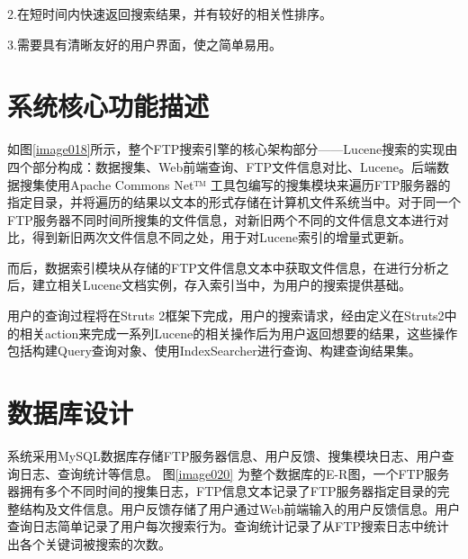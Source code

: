 2.在短时间内快速返回搜索结果，并有较好的相关性排序。

3.需要具有清晰友好的用户界面，使之简单易用。
\section{系统核心功能描述}
如图\ref{image018}所示，整个FTP搜索引擎的核心架构部分——Lucene搜索的实现由四个部分构成：数据搜集、Web前端查询、FTP文件信息对比、Lucene。后端数据搜集使用Apache Commons Net™ 工具包编写的搜集模块来遍历FTP服务器的指定目录，并将遍历的结果以文本的形式存储在计算机文件系统当中。对于同一个FTP服务器不同时间所搜集的文件信息，对新旧两个不同的文件信息文本进行对比，得到新旧两次文件信息不同之处，用于对Lucene索引的增量式更新。

而后，数据索引模块从存储的FTP文件信息文本中获取文件信息，在进行分析之后，建立相关Lucene文档实例，存入索引当中，为用户的搜索提供基础。

用户的查询过程将在Struts 2框架下完成，用户的搜索请求，经由定义在Struts2中的相关action来完成一系列Lucene的相关操作后为用户返回想要的结果，这些操作包括构建Query查询对象、使用IndexSearcher进行查询、构建查询结果集。


\section{数据库设计}
系统采用MySQL数据库存储FTP服务器信息、用户反馈、搜集模块日志、用户查询日志、查询统计等信息。
图\ref{image020} 为整个数据库的E-R图，一个FTP服务器拥有多个不同时间的搜集日志，FTP信息文本记录了FTP服务器指定目录的完整结构及文件信息。用户反馈存储了用户通过Web前端输入的用户反馈信息。用户查询日志简单记录了用户每次搜索行为。查询统计记录了从FTP搜索日志中统计出各个关键词被搜索的次数。
\newpage
{}

